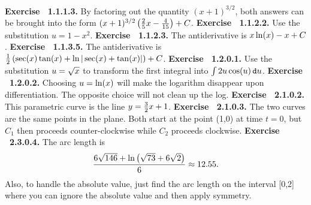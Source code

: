 \par 
 {\noindent \protect \bf  Exercise ~1.1.1.3.} By factoring out the quantity $(x+1)^{3/2}$, both answers can be brought into the form $(x+1)^{3/2}\left (\protect \frac  {2}{5}x-\protect \frac  {4}{15}\right )+C$. \protect \newline  \protect \newline  
 {\noindent \protect \bf  Exercise ~1.1.2.2.} Use the substitution $u=1-x^2$. \protect \newline  \protect \newline  
 {\noindent \protect \bf  Exercise ~1.1.2.3.} The antiderivative is $x\protect \qopname  \relax o{ln}(x)-x+C$. \protect \newline  \protect \newline  
 {\noindent \protect \bf  Exercise ~1.1.3.5.} The antiderivative is $\protect \frac  {1}{2}\left (\protect \qopname  \relax o{sec}(x)\protect \qopname  \relax o{tan}(x)+\protect \qopname  \relax o{ln}|\protect \qopname  \relax o{sec}(x)+\protect \qopname  \relax o{tan}(x)|\right )+C$. \protect \newline  \protect \newline  
 {\noindent \protect \bf  Exercise ~1.2.0.1.} Use the substitution $u=\protect \sqrt  {x}$ to transform the first integral into $\intop 2u\protect \qopname  \relax o{cos}(u) \mathop {}\protect \tmspace  -\thinmuskip {.1667em}\protect \mathtt  {d}u$. \protect \newline  \protect \newline  
 {\noindent \protect \bf  Exercise ~1.2.0.2.} Choosing $u=\protect \qopname  \relax o{ln}(x)$ will make the logarithm disappear upon differentiation. The opposite choice will not clean up the log. \protect \newline  \protect \newline  
 {\noindent \protect \bf  Exercise ~2.1.0.2.} This parametric curve is the line $y=\protect \frac  {3}{2}x+1$. \protect \newline  \protect \newline  
 {\noindent \protect \bf  Exercise ~2.1.0.3.} The two curves are the same points in the plane. Both start at the point (1,0) at time $t=0$, but $C_1$ then proceeds counter-clockwise while $C_2$ proceeds clockwise. \protect \newline  \protect \newline  
 {\noindent \protect \bf  Exercise ~2.3.0.4.} The arc length is $$\protect \frac  {6\protect \sqrt  {146}+\protect \qopname  \relax o{ln}\left (\protect \sqrt  {73}+6\protect \sqrt  {2}\right )}{6}\approx 12.55.$$ Also, to handle the absolute value, just find the arc length on the interval [0,2] where you can ignore the absolute value and then apply symmetry. \protect \newline  \protect \newline  
